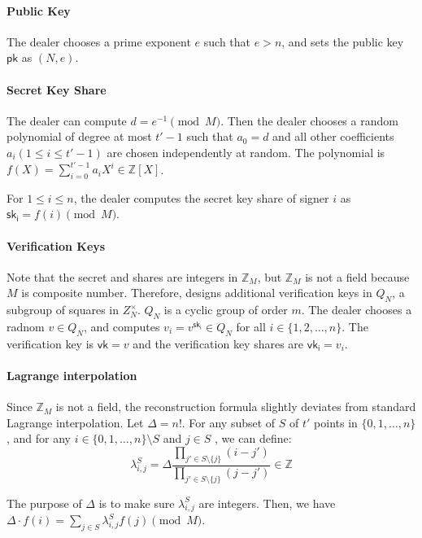 \paragraph{Public Key} The dealer chooses a prime exponent $e$ such that $e>n$, and sets the public key $\mathsf{pk}$ as $(N, e)$. 

\paragraph{Secret Key Share} The dealer can compute $d=e^{-1}\pmod{M}$. Then the dealer chooses a random polynomial of degree at most $t'-1$ such that $a_0=d$ and all other coefficients $a_i (1\le i \le t'-1)$ are chosen independently at random. The polynomial is $f(X) = \sum_{i=0}^{t'-1}a_i X^i \in \mathbb{Z}[X]$. 

\par For $1\le i \le n$, the dealer computes the secret key share of signer $i$ as $\mathsf{sk_i} = f(i)\pmod M$. 

\paragraph{Verification Keys} Note that the secret and shares are integers in $\mathbb{Z}_M$, but $\mathbb{Z}_M$ is not a field because $M$ is composite number. Therefore, \cite{DBLP:conf/eurocrypt/Shoup00} designs additional verification keys in $Q_N$, a subgroup of squares in $Z_N^\times$. $Q_N$ is a cyclic group of order $m$. The dealer chooses a radnom $v\in Q_N$, and computes $v_i=v^{\mathsf{sk_i}}\in Q_N$ for all $i\in \{1, 2, \dots, n\}$. The verification key is $\mathsf{vk}=v$ and the verification key shares are $\mathsf{vk_i}=v_i$. 

\paragraph{Lagrange interpolation} Since $\mathbb{Z}_M$ is not a field, the reconstruction formula slightly deviates from standard Lagrange interpolation. Let $\Delta=n!$. For any subset of $S$ of $t'$ points in $\{0,1,\dots, n\}$, and for any $i\in\{0,1,\dots, n\}\setminus S$ and $j\in S$ , we can define: 
\begin{equation*}
    \lambda_{i,j}^S = \Delta \frac{\prod_{j'\in S\setminus\{j\}} (i-j')}{\prod_{j'\in S\setminus \{j\}} (j-j')}\in \mathbb{Z}
\end{equation*} 

The purpose of $\Delta$ is to make sure $\lambda_{i, j}^S$ are integers. Then, we have $\Delta\cdot f(i) = \sum_{j\in S} \lambda_{i,j}^S f(j)\pmod{M}$. 

